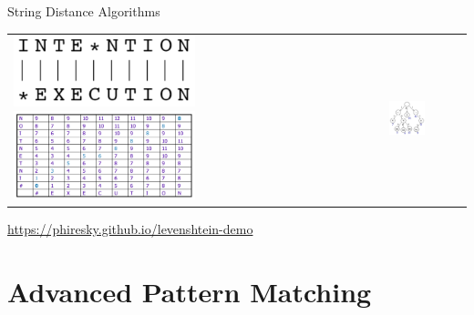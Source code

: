 \documentclass[10pt]{beamer}
\begin{document}
\begin{frame}{String Distance Algorithms}

\begin{tabular}{p{5cm} p{7cm}}
    \vspace{0pt}
    \includegraphics[width=0.5\textwidth]{figures/string-alignment.png}
	  \vspace{0pt}
    \includegraphics[width=0.5\textwidth]{figures/edit-distance-table.png}
    &
    \vspace{0pt}
    \includegraphics[width=0.5\textwidth]{figures/trie-example.png}
\end{tabular}

\begin{center}
  \textcolor{blue}{\url{https://phiresky.github.io/levenshtein-demo}}
\end{center}

\end{frame}

\section{Advanced Pattern Matching}
\end{document}
